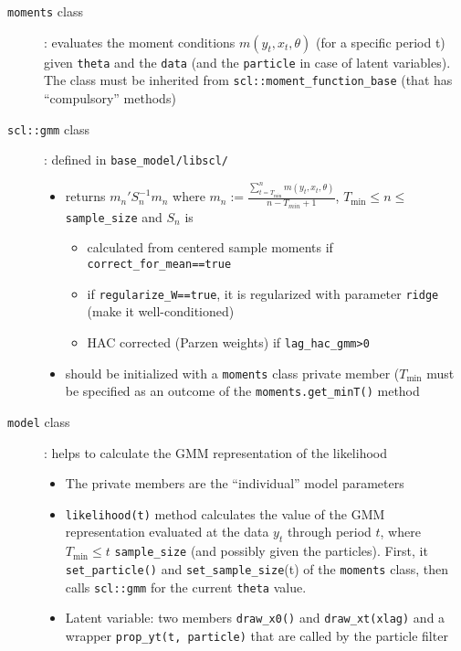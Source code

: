 \documentclass[11pt, letterpaper, notitlepage]{article}
\begin{document}
\begin{description}

\item[\texttt{moments} class]: evaluates the moment conditions $m(y_t, x_t, \theta)$ (for a specific period t) given \texttt{theta} and the \texttt{data} (and the \texttt{particle} in case of latent variables). The class must be inherited from \texttt{scl::moment\_function\_base} (that has ``compulsory'' methods)

\item[\texttt{scl::gmm} class]: defined in \texttt{base\_model/libscl/}
\begin{itemize}
\item returns $m_n'S_n^{-1} m_n$ where $m_n := \frac{\sum_{t=T_{\min}}^{n} m(y_t, x_t, \theta)}{n-T_{min}+1}$, $T_{\min}\leq n\leq$\texttt{sample\_size} and $S_n$ is 
\begin{itemize}
\item calculated from centered sample moments if \texttt{correct\_for\_mean==true}
\item if \texttt{regularize\_W==true}, it is regularized with parameter \texttt{ridge} (make it well-conditioned)
\item HAC corrected (Parzen weights) if \texttt{lag\_hac\_gmm>0}
\end{itemize}
\item should be initialized with a \texttt{moments} class private member ($T_{\min}$ must be specified as an outcome of the \texttt{moments.get\_minT()} method  
\end{itemize}
\item[\texttt{model} class]: helps to calculate the GMM representation of the likelihood

\begin{itemize}
\item The private members are the ``individual'' model parameters
\item \texttt{likelihood(t)} method calculates the value of the GMM representation evaluated at the data $y_t$ through period $t$, where  $T_{\min}\leq t$ \texttt{sample\_size} (and possibly given the particles). First, it \texttt{set\_particle()} and \texttt{set\_sample\_size}(t) of the \texttt{moments} class, then calls \texttt{scl::gmm} for the current \texttt{theta} value. 
\item Latent variable: two members \texttt{draw\_x0()} and \texttt{draw\_xt(xlag)} and a wrapper \texttt{prop\_yt(t, particle)} that are called by the particle filter 
\end{itemize}


\end{description}
\end{document}
